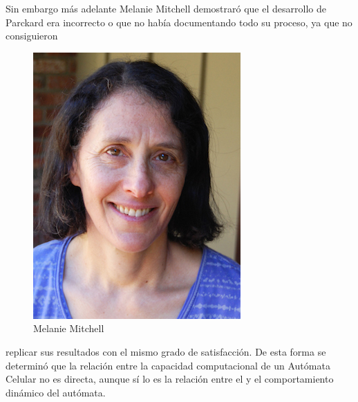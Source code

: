 \newpage
Sin embargo más adelante Melanie Mitchell demostraró que el desarrollo de Parckard era incorrecto o que no había documentando todo su proceso, ya que no consiguieron
\begin{figure}
\centering
\includegraphics[scale=1]{imagenes/melani.jpg}
\caption{Melanie Mitchell}
\label{fig:melanie}
\end{figure}

 replicar sus resultados con el mismo grado de satisfacción. De esta forma se determinó que la relación entre la capacidad computacional de un Autómata Celular no es directa, aunque sí lo es la relación entre el y el comportamiento dinámico del autómata.\\
$\enspace \enspace \enspace \enspace \enspace$\\
$\enspace \enspace \enspace \enspace \enspace$\\

